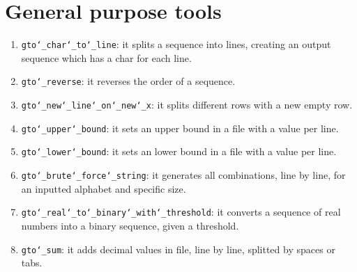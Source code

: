 \chapter{General purpose tools}
\label{seq}

\begin{enumerate}

\item \texttt{gto\char`_char\char`_to\char`_line}: it splits a sequence into lines, creating an output sequence which has a char for each line.

\item \texttt{gto\char`_reverse}: it reverses the order of a sequence.

\item \texttt{gto\char`_new\char`_line\char`_on\char`_new\char`_x}: it splits different rows with a new empty row.

\item \texttt{gto\char`_upper\char`_bound}: it sets an upper bound in a file with a value per line.

\item \texttt{gto\char`_lower\char`_bound}: it sets an lower bound in a file with a value per line.

\item \texttt{gto\char`_brute\char`_force\char`_string}: it generates all combinations, line by line, for an inputted alphabet and specific size.

\item \texttt{gto\char`_real\char`_to\char`_binary\char`_with\char`_threshold}: it converts a sequence of real numbers into a binary sequence, given a threshold.

\item \texttt{gto\char`_sum}: it adds decimal values in file, line by line, splitted by spaces or tabs.

\end{enumerate}










